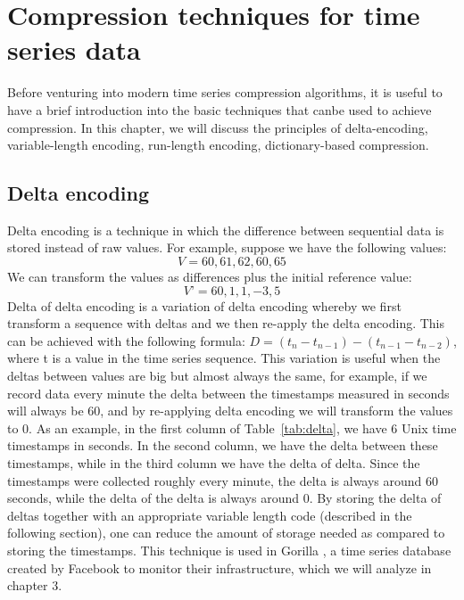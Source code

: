 
\chapter{Compression techniques for time series data}
Before venturing into modern time series compression algorithms, it is useful to have a brief
introduction into the basic techniques that canbe used to achieve compression. In this chapter,
we will discuss the principles of delta-encoding, variable-length encoding, run-length encoding,
dictionary-based compression.

\section{Delta encoding}
Delta encoding is a technique in which the difference between sequential data is stored instead
of raw values. For example, suppose we have the following values:
$$V= 60, 61, 62, 60, 65$$
We can transform the values as differences plus the initial reference value:
$$V’= 60, 1, 1, -3, 5$$
Delta of delta encoding is a variation of delta encoding whereby we first transform a sequence
with deltas and we then re-apply the delta encoding. This can be achieved with the following
formula: $D = (t_{n} - t_{n-1}) - (t_{n-1} - t_{n-2})$, where t is a value in the time series
sequence. This variation is useful when the deltas between values are big but almost always
the same, for example, if we record data every minute the delta between the timestamps measured
in seconds will always be 60, and by re-applying delta encoding we will transform the values
to 0. As an example, in the first column of Table~\ref{tab:delta}, we have 6 Unix time timestamps
in seconds. In the second column, we have the delta between these timestamps, while in the
third column we have the delta of delta.
Since the timestamps were collected roughly every minute, the delta is always around 60 seconds,
while the delta of the delta is always around 0. By storing the delta of deltas together with
an appropriate variable length code (described in the following section), one can reduce the
amount of storage needed as compared to storing the timestamps.
This technique is used in Gorilla \cite{Pelkonen2015Gorilla}, a time series database created
by Facebook to monitor their infrastructure, which we will analyze in chapter 3.

